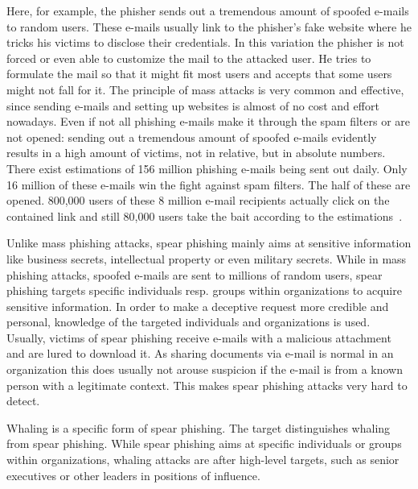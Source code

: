 \begin{description}[leftmargin=0cm]
	\item[Mass Phishing] Here, for example, the phisher sends out a tremendous amount of spoofed e-mails to random users. These e-mails usually link to the phisher's fake website where he tricks his victims to disclose their credentials. In this variation the phisher is not forced or even able to customize the mail to the attacked user. He tries to formulate the mail so that it might fit most users and accepts that some users might not fall for it. The principle of mass attacks is very common and effective, since sending e-mails and setting up websites is almost of no cost and effort nowadays. Even if not all phishing e-mails make it through the spam filters or are not opened: sending out a tremendous amount of spoofed e-mails evidently results in a high amount of victims, not in relative, but in absolute numbers. There exist estimations of 156 million phishing e-mails being sent out daily. Only 16 million of these e-mails win the fight against spam filters. The half of these are opened. 800,000 users of these 8 million e-mail recipients actually click on the contained link and still 80,000 users take the bait according to the estimations~\cite{takethebait}.  
	\item[Spear Phishing] Unlike mass phishing attacks, spear phishing mainly aims at sensitive information like business secrets, intellectual property or even military secrets. While in mass phishing attacks, spoofed e-mails are sent to millions of random users, spear phishing targets specific individuals resp. groups within organizations to acquire sensitive information. In order to make a deceptive request more credible and personal, knowledge of the targeted individuals and organizations is used. Usually, victims of spear phishing receive e-mails with a malicious attachment and are lured to download it. As sharing documents via e-mail is normal in an organization this does usually not arouse suspicion if the e-mail is from a known person with a legitimate context. This makes spear phishing attacks very hard to detect\cite{trendlabs2012spear,statephishinghong}.
	\item[Whaling] Whaling is a specific form of spear phishing. The target distinguishes whaling from spear phishing. While spear phishing aims at specific individuals or groups within organizations, whaling attacks are after high-level targets, such as senior executives or other leaders in positions of influence.
\end{description}

